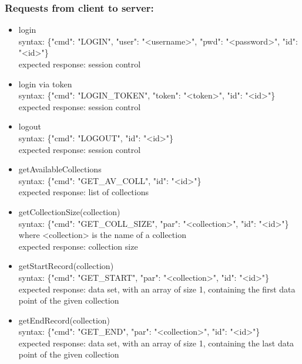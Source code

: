 \documentclass[oneside, english, final]{design}
\begin{document}
\subsubsection{Requests from client to server:}
\begin{itemize}
	\item{login}
	      \\
	      syntax: \{"cmd": "LOGIN", "user": "<username>", "pwd": "<password>", "id": "<id>"\} \\
	      expected response: session control

	\item{login via token}
	      \\
	      syntax: \{"cmd": "LOGIN\_TOKEN", "token": "<token>", "id": "<id>"\} \\
	      expected response: session control

	\item{logout}
	      \\
	      syntax: \{"cmd": "LOGOUT", "id": "<id>"\} \\
	      expected response: session control

	\item{getAvailableCollections}
	      \\
	      syntax: \{"cmd": "GET\_AV\_COLL", "id": "<id>"\} \\
	      expected response: list of collections

	\item{getCollectionSize(collection)}
	      \\
	      syntax: \{"cmd": "GET\_COLL\_SIZE", "par": "<collection>", "id": "<id>"\} \\
	      where <collection> is the name of a collection\\
	      expected response: collection size

	\item{getStartRecord(collection)}
	      \\
	      syntax: \{"cmd": "GET\_START", "par": "<collection>", "id": "<id>"\} \\
	      expected response: data set, with an array of size 1, containing the first data point of the given collection

	\item{getEndRecord(collection)}
	      \\
	      syntax: \{"cmd": "GET\_END", "par": "<collection>", "id": "<id>"\} \\
	      expected response: data set, with an array of size 1, containing the last data point of the given collection


\end{itemize}
\end{document}
